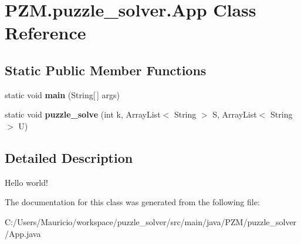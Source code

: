 \hypertarget{class_p_z_m_1_1puzzle__solver_1_1_app}{}\section{P\+Z\+M.\+puzzle\+\_\+solver.\+App Class Reference}
\label{class_p_z_m_1_1puzzle__solver_1_1_app}
\subsection*{Static Public Member Functions}
\begin{DoxyCompactItemize}
\item 
\hypertarget{class_p_z_m_1_1puzzle__solver_1_1_app_ad5c5d6b33b4fdb96c3d213fba2381f54}{}\label{class_p_z_m_1_1puzzle__solver_1_1_app_ad5c5d6b33b4fdb96c3d213fba2381f54} 
static void {\bfseries main} (String\mbox{[}$\,$\mbox{]} args)
\item 
\hypertarget{class_p_z_m_1_1puzzle__solver_1_1_app_a75974ed1d4d8b0a7f07ec4c6e9733d1b}{}\label{class_p_z_m_1_1puzzle__solver_1_1_app_a75974ed1d4d8b0a7f07ec4c6e9733d1b} 
static void {\bfseries puzzle\+\_\+solve} (int k, Array\+List$<$ String $>$ S, Array\+List$<$ String $>$ U)
\end{DoxyCompactItemize}


\subsection{Detailed Description}
Hello world! 

The documentation for this class was generated from the following file\+:\begin{DoxyCompactItemize}
\item 
C\+:/\+Users/\+Mauricio/workspace/puzzle\+\_\+solver/src/main/java/\+P\+Z\+M/puzzle\+\_\+solver/App.\+java\end{DoxyCompactItemize}
